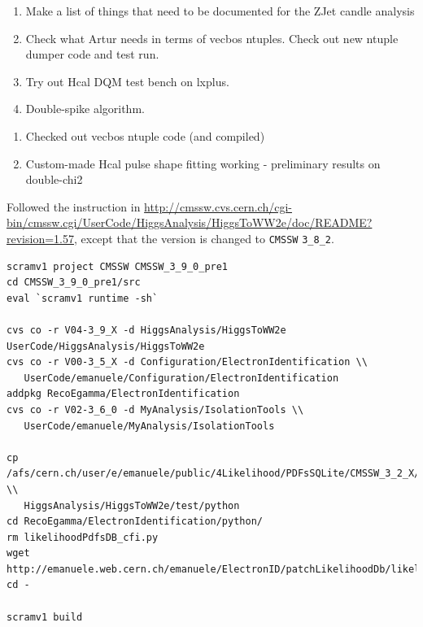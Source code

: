 

\begin{enumerate}
\item Make a list of things that need to be documented for the ZJet candle analysis
\item Check what Artur needs in terms of vecbos ntuples.  Check out new ntuple dumper code and test run.
\item Try out Hcal DQM test bench on lxplus.
\item Double-spike algorithm.
\end{enumerate}


\begin{enumerate}
\item Checked out vecbos ntuple code (and compiled)
\item Custom-made Hcal pulse shape fitting working - preliminary results on double-chi2
\end{enumerate}


Followed the instruction in \url{http://cmssw.cvs.cern.ch/cgi-bin/cmssw.cgi/UserCode/HiggsAnalysis/HiggsToWW2e/doc/README?revision=1.57},
except that the version is changed to \texttt{CMSSW} \texttt{3\_8\_2}.

\begin{verbatim}
scramv1 project CMSSW CMSSW_3_9_0_pre1
cd CMSSW_3_9_0_pre1/src
eval `scramv1 runtime -sh`

cvs co -r V04-3_9_X -d HiggsAnalysis/HiggsToWW2e UserCode/HiggsAnalysis/HiggsToWW2e
cvs co -r V00-3_5_X -d Configuration/ElectronIdentification \\
   UserCode/emanuele/Configuration/ElectronIdentification
addpkg RecoEgamma/ElectronIdentification
cvs co -r V02-3_6_0 -d MyAnalysis/IsolationTools \\
   UserCode/emanuele/MyAnalysis/IsolationTools

cp /afs/cern.ch/user/e/emanuele/public/4Likelihood/PDFsSQLite/CMSSW_3_2_X/electronIdLikelihoodTkIsolated.db \\
   HiggsAnalysis/HiggsToWW2e/test/python
cd RecoEgamma/ElectronIdentification/python/
rm likelihoodPdfsDB_cfi.py
wget http://emanuele.web.cern.ch/emanuele/ElectronID/patchLikelihoodDb/likelihoodPdfsDB_cfi.py
cd -

scramv1 build
\end{verbatim}

